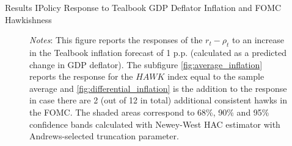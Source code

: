 \documentclass[11pt,pdf,aspectratio=129]{beamer}
\begin{document}
\begin{frame}{Results I}{Policy Response to Tealbook GDP Deflator Inflation and FOMC Hawkishness}
\begin{figure}[!htbp]
\begin{subfigure}[b]{0.48\textwidth}
        \end{subfigure}\vspace{-4ex}
            {\begin{flushleft}\tiny\textit{Notes}: This figure reports the responses of the $r_t-\rho_t$ to an increase in the Tealbook inflation forecast of 1 p.p. (calculated as a predicted change in GDP deflator). 
            The subfigure \ref{fig:average_inflation} reports the response for the $\mathit{HAWK}$ index equal to the sample average and \ref{fig:differential_inflation} is the addition to the response in case there are 2 (out of 12 in total) additional consistent hawks in the FOMC. The shaded areas correspond to 68\%, 90\% and 95\% confidence bands calculated with Newey-West HAC estimator with Andrews-selected truncation parameter.\end{flushleft}}
    \end{figure}
    
\end{frame}
\end{document}
